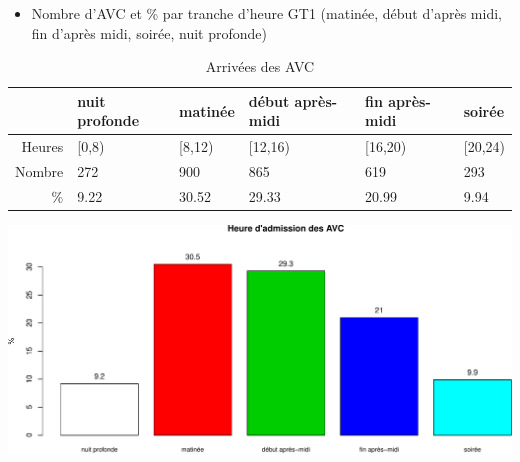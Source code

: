 \documentclass[]{article}
\begin{document}
\begin{itemize}
\itemsep1pt\parskip0pt
\item
  Nombre d'AVC et \% par tranche d'heure GT1 (matinée, début d'après
  midi, fin d'après midi, soirée, nuit profonde)
\end{itemize}

\begin{table}[ht]
\centering
\begin{tabular}{rlllll}
  \hline
 & nuit profonde & matinée & début après-midi & fin après-midi & soirée \\ 
  \hline
Heures & [0,8) & [8,12) & [12,16) & [16,20) & [20,24) \\ 
  Nombre & 272 & 900 & 865 & 619 & 293 \\ 
  \% & 9.22 & 30.52 & 29.33 & 20.99 & 9.94 \\ 
   \hline
\end{tabular}
\caption{Arrivées des AVC} 
\label{avc.arrive}
\end{table}

\includegraphics{Figs/avc_periode-1.pdf}
\end{document}
